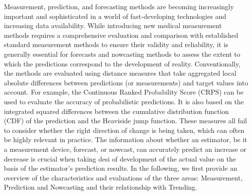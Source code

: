 
Measurement, prediction, and forecasting methods are becoming increasingly important and sophisticated in a world of fast-developing technologies and increasing data availability. While introducing new medical measurement methods requires a comprehensive evaluation and comparison with established standard measurement methods to ensure their validity and reliability, it is generally essential for forecasts and nowcasting methods to assess the extent to which the predictions correspond to the development of reality. Conventionally, the methods are evaluated using distance measures that take aggregated local absolute differences between predictions (or measurements) and target values into account. For example, the Continuous Ranked Probability Score (CRPS) can be used to evaluate the accuracy of probabilistic predictions. It is also based on the integrated squared differences between the cumulative distribution function (CDF) of the prediction and the Heaviside jump function. These measures all fail to consider whether the right direction of change is being taken, which can often be highly relevant in practice. The information about whether an estimator, be it a measurement device, forecast, or nowcast, can accurately predict an increase or decrease is crucial when taking desi of development of the actual value on the basis of the estimator's prediction results. In the following, we first provide an overview of the characteristics and evaluations of the three areas: Measurement, Prediction and Nowcasting and their relationship with Trending.
 
